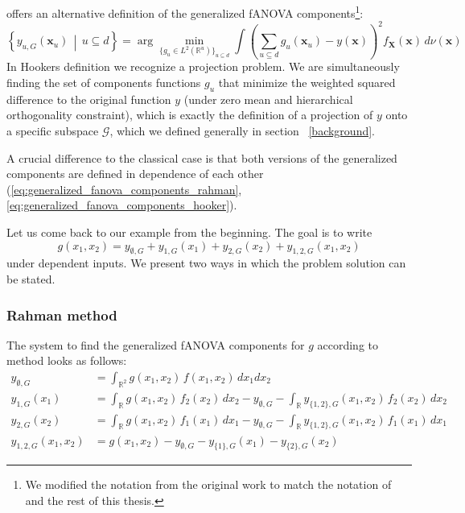\cite{hooker2007} offers an alternative definition of the generalized fANOVA components\footnote{We modified the notation from the original work to match the notation of \cite{rahman2014} and the rest of this thesis.}:
\begin{equation}
\left\{ y_{u, G}(\boldsymbol{x}_u) \,\middle|\, u \subseteq d \right\}
= \arg\min_{\{g_u \in L^2(\mathbb{R}^u)\}_{u \subseteq d}} 
\int \left( \sum_{u \subseteq d} g_u(\boldsymbol{x}_u) - y(\boldsymbol{x}) \right)^2 f_{\boldsymbol{X}}(\boldsymbol{x}) \, d \nu (\boldsymbol{x})
\label{eq:generalized_fanova_components_hooker}
\end{equation}
In Hookers definition we recognize a projection problem. We are simultaneously finding the set of components functions $g_u$ that minimize the weighted squared difference to the original function $y$ (under zero mean and hierarchical orthogonality constraint), which is exactly the definition of a projection of $y$ onto a specific subspace $\mathcal{G}$, which we defined generally in section ~\ref{background}.\par

A crucial difference to the classical case is that both versions of the generalized components are defined in dependence of each other (\autoref{eq:generalized_fanova_components_rahman}, \autoref{eq:generalized_fanova_components_hooker}).

Let us come back to our example from the beginning. The goal is to write
\[
g(x_1, x_2) = y_{\emptyset, G} + y_{1, G}(x_1) + y_{2, G}(x_2) + y_{1,2, G}(x_1, x_2)
\]
under dependent inputs. We present two ways in which the problem solution can be stated.\par

\subsubsection*{Rahman method}
The system to find the generalized fANOVA components for $g$ according to \cite{rahman2014} method looks as follows:
\begin{align*}
    y_{\emptyset, G} &= \int_{\mathbb{R}^2} g(x_1, x_2)\, f(x_1, x_2)\, dx_1 dx_2 \\
    y_{1, G}(x_1) &= \int_{\mathbb{R}} g(x_1, x_2)\, f_2(x_2)\, dx_2
    - y_{\emptyset, G}
    - \int_{\mathbb{R}} y_{\{1,2\}, G}(x_1, x_2)\, f_2(x_2)\, dx_2\\
    y_{2, G}(x_2) &= \int_{\mathbb{R}} g(x_1, x_2)\, f_1(x_1)\, dx_1
    - y_{\emptyset, G}
    - \int_{\mathbb{R}} y_{\{1,2\}, G}(x_1, x_2)\, f_1(x_1)\, dx_1\\
    y_{1,2, G}(x_1, x_2) &= g(x_1, x_2) - y_{\emptyset, G} - y_{\{1\}, G}(x_1) - y_{\{2\}, G}(x_2)
\end{align*}

